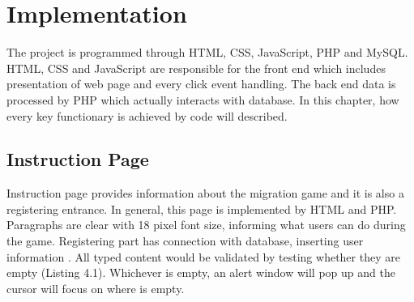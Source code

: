 \chapter{Implementation}
The project is programmed through HTML, CSS, JavaScript, PHP and MySQL. HTML, CSS and JavaScript are responsible for the front end which includes presentation of web page and every click event handling. The back end data is processed by PHP which actually interacts with database. In this chapter, how every key functionary is achieved by code will described.
\section{Instruction Page}
Instruction page provides information about the migration game and it is also a registering entrance. In general, this page is implemented by HTML and PHP. Paragraphs are clear with 18 pixel font size, informing what users can do during the game. Registering part has connection with database, inserting user information . All typed content would be validated by testing whether they are empty (Listing 4.1). Whichever is empty, an alert window will pop up and the cursor will focus on where is empty.

